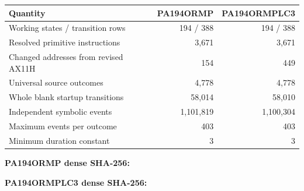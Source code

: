 \begin{center}
\begin{tabular}{lrr}
\toprule
Quantity & PA194ORMP & PA194ORMPLC3\\
\midrule
Working states / transition rows & 194 / 388 & 194 / 388\\
Resolved primitive instructions & 3,671 & 3,671\\
Changed addresses from revised AX11H & 154 & 449\\
Universal source outcomes & 4,778 & 4,778\\
Whole blank startup transitions & 58,014 & 58,010\\
Independent symbolic events & 1,101,819 & 1,100,304\\
Maximum events per outcome & 403 & 403\\
Minimum duration constant & 3 & 3\\
\bottomrule
\end{tabular}
\end{center}
\textbf{PA194ORMP dense SHA-256:}\par
{\small{}}\par
\textbf{PA194ORMPLC3 dense SHA-256:}\par
{\small{}}\par
